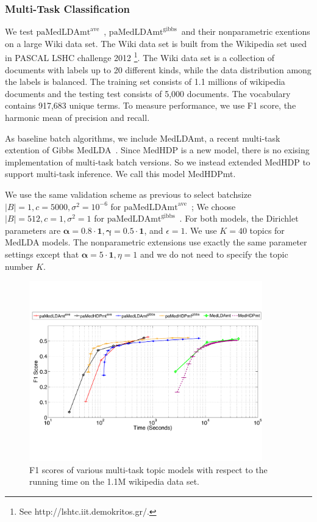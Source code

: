 \documentclass[twoside,11pt]{article}
\newcommand{\alphav}{\bm \alpha}
\newcommand{\gammav}{\bm \gamma}
\newcommand\paMedLDAmtave{$\text{paMedLDAmt}^{\text{ave}}$~}
\newcommand\paMedLDAmtgibbs{$\text{paMedLDAmt}^{\text{gibbs}}$~}
\begin{document}
\subsubsection{Multi-Task Classification}



We test \paMedLDAmtave, \paMedLDAmtgibbs and their nonparametric exentions on a large Wiki data set. The Wiki data set is built from the Wikipedia set used in PASCAL LSHC challenge 2012 \footnote{See http://lshtc.iit.demokritos.gr/.}. The Wiki data set is a collection of documents with labels up to 20 different kinds, while the data distribution among the labels is balanced. The training set consists of 1.1 millions of wikipedia documents and the testing test consists of 5,000 documents. The vocabulary contains 917,683 unique terms.
To measure performance, we use F1 score, the harmonic mean of precision and recall.

As baseline batch algorithms, we include MedLDAmt, a recent multi-task extention of Gibbs MedLDA~\citep{zhu2013scalable}. Since MedHDP is a new model, there is no exising implementation of multi-task batch versions. So we instead extended MedHDP to support multi-task inference. We call this model MedHDPmt.

We use the same validation scheme as previous to select batchsize $|B| = 1, c = 5000, \sigma^2 = 10^{-6}$ for \paMedLDAmtave; We choose $|B| = 512, c = 1, \sigma^2 = 1$ for \paMedLDAmtgibbs. For both models, the Dirichlet parameters are $\alphav = 0.8 \cdot \bm{1}, \gammav = 0.5 \cdot \bm{1}$,  and $\epsilon = 1$. We use $K = 40$ topics for MedLDA models. The nonparametric extensions use exactly the same parameter settings except that $\alphav = 5 \cdot \bm{1}, \eta = 1$ and we do not need to specify the topic number $K$.

\begin{figure}[t]
\centering
\includegraphics[width = 0.9\textwidth]{plot_mtask_commit_jmlr.pdf}
\vspace*{-0.2cm}
\caption{F1 scores of various multi-task topic models with respect to the running time on the 1.1M wikipedia data set.}
\vspace*{-0.4cm}
\label{fg:multic_mtask_commit}
\end{figure}
\end{document}
